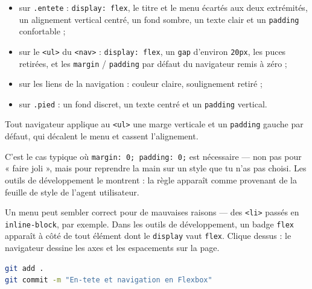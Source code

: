 \documentclass[a4paper,11pt]{article}
\begin{document}
\begin{tcolorbox}[definition, title={À produire dans la section 2 de \texttt{style.css}}]
\begin{itemize}
  \item sur \texttt{.entete} : \texttt{display: flex}, le titre et le menu écartés aux deux extrémités, un alignement vertical centré, un fond sombre, un texte clair et un \texttt{padding} confortable ;
  \item sur le \texttt{<ul>} du \texttt{<nav>} : \texttt{display: flex}, un \texttt{gap} d'environ \texttt{20px}, les puces retirées, et les \texttt{margin} / \texttt{padding} par défaut du navigateur remis à zéro ;
  \item sur les liens de la navigation : couleur claire, soulignement retiré ;
  \item sur \texttt{.pied} : un fond discret, un texte centré et un \texttt{padding} vertical.
\end{itemize}
\end{tcolorbox}

\begin{tcolorbox}[attention, title={Le \texttt{<ul>} a des marges que tu n'as pas écrites}]
Tout navigateur applique au \texttt{<ul>} une marge verticale et un \texttt{padding} gauche par défaut, qui décalent le menu et cassent l'alignement.

\vspace{3pt}
C'est le cas typique où \texttt{margin: 0; padding: 0;} est nécessaire --- non pas pour « faire joli », mais pour reprendre la main sur un style que tu n'as pas choisi. Les outils de développement le montrent : la règle apparaît comme provenant de la feuille de style de l'agent utilisateur.
\end{tcolorbox}

\begin{tcolorbox}[astuce, title={Vérifie que tu utilises bien Flexbox}]
Un menu peut sembler correct pour de mauvaises raisons --- des \texttt{<li>} passés en \texttt{inline-block}, par exemple. Dans les outils de développement, un badge \texttt{flex} apparaît à côté de tout élément dont le \texttt{display} vaut \texttt{flex}. Clique dessus : le navigateur dessine les axes et les espacements sur la page.
\end{tcolorbox}

\begin{tcolorbox}[astuce, title={Point d'étape}]
\begin{lstlisting}[language=bash, numbers=none]
git add .
git commit -m "En-tete et navigation en Flexbox"
\end{lstlisting}
\end{tcolorbox}
\end{document}
